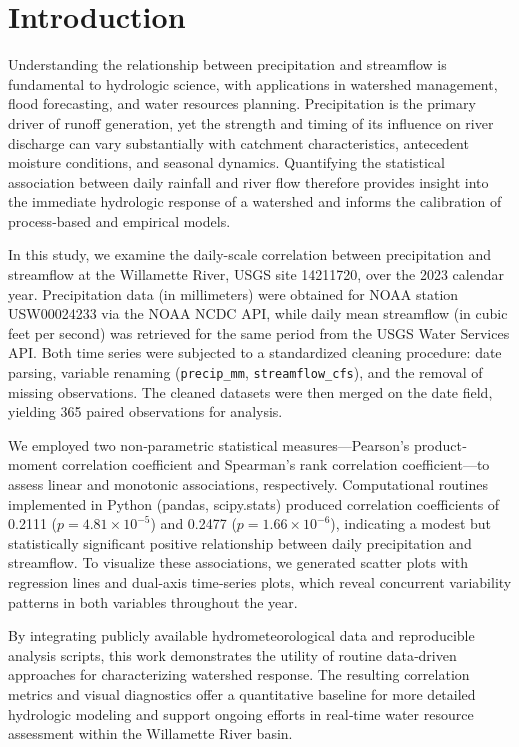 \documentclass[preprint,12pt]{elsarticle}
\begin{document}
\section{Introduction}

Understanding the relationship between precipitation and streamflow is fundamental to hydrologic science, with applications in watershed management, flood forecasting, and water resources planning. Precipitation is the primary driver of runoff generation, yet the strength and timing of its influence on river discharge can vary substantially with catchment characteristics, antecedent moisture conditions, and seasonal dynamics. Quantifying the statistical association between daily rainfall and river flow therefore provides insight into the immediate hydrologic response of a watershed and informs the calibration of process-based and empirical models.

In this study, we examine the daily-scale correlation between precipitation and streamflow at the Willamette River, USGS site 14211720, over the 2023 calendar year. Precipitation data (in millimeters) were obtained for NOAA station USW00024233 via the NOAA NCDC API, while daily mean streamflow (in cubic feet per second) was retrieved for the same period from the USGS Water Services API. Both time series were subjected to a standardized cleaning procedure: date parsing, variable renaming (\texttt{precip\_mm}, \texttt{streamflow\_cfs}), and the removal of missing observations. The cleaned datasets were then merged on the date field, yielding 365 paired observations for analysis.

We employed two non‐parametric statistical measures—Pearson's product‐moment correlation coefficient and Spearman's rank correlation coefficient—to assess linear and monotonic associations, respectively. Computational routines implemented in Python (pandas, scipy.stats) produced correlation coefficients of 0.2111 ($p = 4.81\times10^{-5}$) and 0.2477 ($p = 1.66\times10^{-6}$), indicating a modest but statistically significant positive relationship between daily precipitation and streamflow. To visualize these associations, we generated scatter plots with regression lines and dual-axis time‐series plots, which reveal concurrent variability patterns in both variables throughout the year.

By integrating publicly available hydrometeorological data and reproducible analysis scripts, this work demonstrates the utility of routine data‐driven approaches for characterizing watershed response. The resulting correlation metrics and visual diagnostics offer a quantitative baseline for more detailed hydrologic modeling and support ongoing efforts in real‐time water resource assessment within the Willamette River basin.
\end{document}
